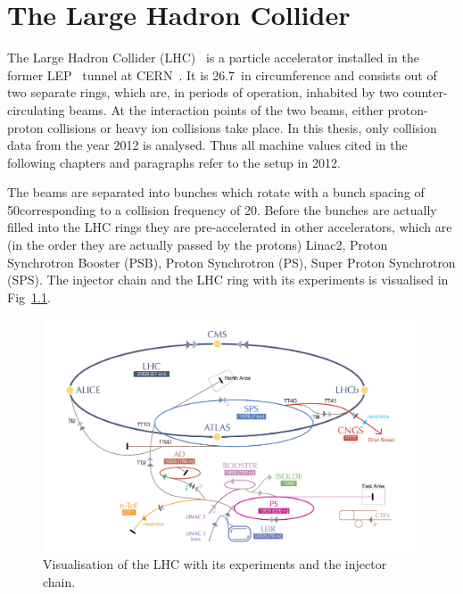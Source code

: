 \chapter{The Large Hadron Collider}

The Large Hadron Collider (LHC)~\cite{bib:LHC_machine_2008,bib:LHC_2004} is a particle accelerator installed in the former LEP~\cite{bib:LEP_design_1984} tunnel at CERN~\cite{bib:CERN:web}.
It is 26.7~\km in circumference and consists out of two separate rings, which are, in periods of operation, inhabited by two counter-circulating beams.
At the interaction points of the two beams, either proton-proton collisions or heavy ion collisions take place.
In this thesis, only collision data from the year 2012 is analysed.
Thus all machine values cited in the following chapters and paragraphs refer to the setup in 2012.

The beams are separated into bunches which rotate with a bunch spacing of 50\ns corresponding to a collision frequency of 20\mhz.
Before the bunches are actually filled into the LHC rings they are pre-accelerated in other accelerators, which are (in the order they are actually passed by the protons) Linac2, Proton  Synchrotron Booster (PSB), Proton Synchrotron (PS), Super Proton Synchrotron (SPS).
The injector chain and the LHC ring with its experiments is visualised in Fig~\ref{fig:LHC}.
\begin{figure}[!bth]
  \centering
      \includegraphics[width=0.99\textwidth]{figures/experiment/LHC/LHC_small.png}
  \caption{Visualisation of the LHC with its experiments and the injector chain.}  
  \label{fig:LHC}
\end{figure}

